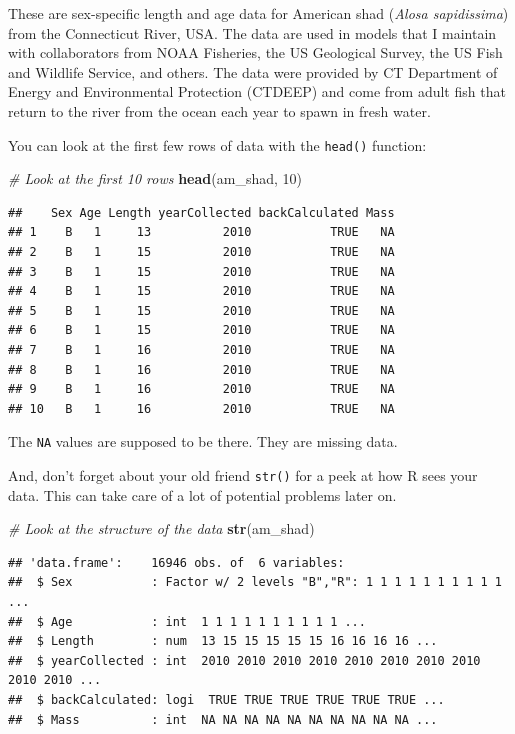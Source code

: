 \documentclass[
]{book}
\newenvironment{Shaded}{\begin{snugshade}}{\end{snugshade}}
\newcommand{\CommentTok}[1]{\textcolor[rgb]{0.56,0.35,0.01}{\textit{#1}}}
\newcommand{\DecValTok}[1]{\textcolor[rgb]{0.00,0.00,0.81}{#1}}
\newcommand{\KeywordTok}[1]{\textcolor[rgb]{0.13,0.29,0.53}{\textbf{#1}}}
\newcommand{\NormalTok}[1]{#1}
\begin{document}
These are sex-specific length and age data for American shad (\emph{Alosa sapidissima}) from the Connecticut River, USA. The data are used in models that I maintain with collaborators from NOAA Fisheries, the US Geological Survey, the US Fish and Wildlife Service, and others. The data were provided by CT Department of Energy and Environmental Protection (CTDEEP) and come from adult fish that return to the river from the ocean each year to spawn in fresh water.

You can look at the first few rows of data with the \texttt{head()} function:

\begin{Shaded}
\begin{Highlighting}[]
\CommentTok{# Look at the first 10 rows}
\KeywordTok{head}\NormalTok{(am_shad, }\DecValTok{10}\NormalTok{)}
\end{Highlighting}
\end{Shaded}

\begin{verbatim}
##    Sex Age Length yearCollected backCalculated Mass
## 1    B   1     13          2010           TRUE   NA
## 2    B   1     15          2010           TRUE   NA
## 3    B   1     15          2010           TRUE   NA
## 4    B   1     15          2010           TRUE   NA
## 5    B   1     15          2010           TRUE   NA
## 6    B   1     15          2010           TRUE   NA
## 7    B   1     16          2010           TRUE   NA
## 8    B   1     16          2010           TRUE   NA
## 9    B   1     16          2010           TRUE   NA
## 10   B   1     16          2010           TRUE   NA
\end{verbatim}

The \texttt{NA} values are supposed to be there. They are missing data.

And, don't forget about your old friend \texttt{str()} for a peek at how R sees your data. This can take care of a lot of potential problems later on.

\begin{Shaded}
\begin{Highlighting}[]
\CommentTok{# Look at the structure of the data}
\KeywordTok{str}\NormalTok{(am_shad)}
\end{Highlighting}
\end{Shaded}

\begin{verbatim}
## 'data.frame':	16946 obs. of  6 variables:
##  $ Sex           : Factor w/ 2 levels "B","R": 1 1 1 1 1 1 1 1 1 1 ...
##  $ Age           : int  1 1 1 1 1 1 1 1 1 1 ...
##  $ Length        : num  13 15 15 15 15 15 16 16 16 16 ...
##  $ yearCollected : int  2010 2010 2010 2010 2010 2010 2010 2010 2010 2010 ...
##  $ backCalculated: logi  TRUE TRUE TRUE TRUE TRUE TRUE ...
##  $ Mass          : int  NA NA NA NA NA NA NA NA NA NA ...
\end{verbatim}
\end{document}
